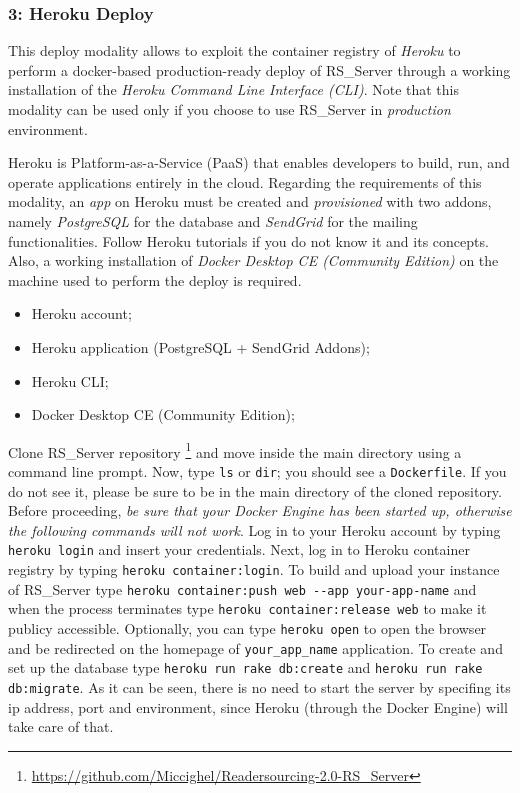 \documentclass[a4paper, english]{article}
\newcounter{subsubsubsection}[subsubsection]
\begin{document}
\subsubsection{3: Heroku Deploy}

This deploy modality allows to exploit the container registry of \emph{Heroku}  to perform a docker-based production-ready deploy of RS\_Server through a working installation of the \emph{Heroku Command Line Interface (CLI)}. Note that this modality can be used only if you choose to use RS\_Server in \emph{production} environment.

Heroku is Platform-as-a-Service (PaaS) that enables developers to build, run, and operate applications entirely in the cloud. Regarding the requirements of this modality, an \emph{app} on Heroku must be created and \emph{provisioned} with two addons, namely \emph{PostgreSQL} for the database and \emph{SendGrid} for the mailing functionalities. Follow Heroku tutorials if you do not know it and its concepts. Also, a working installation of \emph{Docker Desktop CE (Community Edition)} on the machine used to perform the deploy is required.


\begin{itemize}
\item Heroku account;
\item Heroku application (PostgreSQL + SendGrid Addons);
\item Heroku CLI;
\item Docker Desktop CE (Community Edition);
\end{itemize}


Clone RS\_Server repository \footnote{\url{https://github.com/Miccighel/Readersourcing-2.0-RS_Server}} and move inside the main directory using a command line prompt. Now, type \verb|ls| or \verb|dir|; you should see a \verb|Dockerfile|. If you do not see it, please be sure to be in the main directory of the cloned repository. Before proceeding, \emph{be sure that your Docker Engine has been started up, otherwise the following commands will not work}. Log in to your Heroku account by typing \verb|heroku login| and insert your credentials. Next, log in to Heroku container registry by typing \verb|heroku container:login|. To build and upload your instance of RS\_Server type \verb|heroku container:push web --app your-app-name| and when the process terminates type \verb|heroku container:release web| to make it publicy accessible. Optionally, you can type \verb|heroku open| to open the browser and be redirected on the homepage of  \verb|your_app_name| application. To create and set up the database type \verb|heroku run rake db:create| and \verb|heroku run rake db:migrate|. As it can be seen, there is no need to start the server by specifing its ip address, port and environment, since Heroku (through the Docker Engine) will take care of that.
\end{document}
